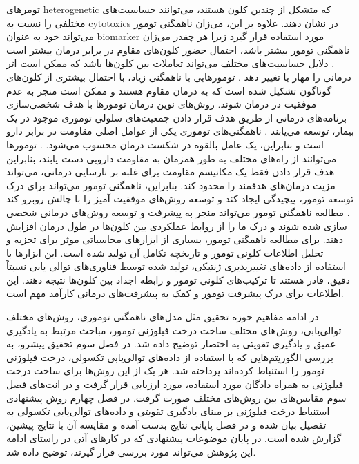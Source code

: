 تومرهای
\gls{heterogenetic}
که متشکل از چندین کلون هستند، می‌توانند حساسیت‌های مختلفی را نسبت به \glspl{cytotoxic} در نشان دهند. علاوه بر این، می‌زان  ناهمگنی تومور می‌تواند خود به عنوان \gls{biomarker} مورد استفاده قرار گیرد زیرا هر چقدر می‌زان ناهمگنی تومور بیشتر باشد، احتمال حضور کلون‌های مقاوم در برابر درمان بیشتر است \cite{truninger2005immunohistochemical}. دلایل حساسیت‌های مختلف می‌تواند تعاملات بین کلون‌ها باشد که ممکن است اثر درمانی را مهار یا تغییر دهد \cite{birbrair2014type}. تومورهایی با ناهمگنی زیاد، با احتمال بیشتری از کلون‌های گوناگون تشکیل شده است که به درمان مقاوم هستند و ممکن است منجر به عدم موفقیت در درمان شوند. روش‌های نوین درمان تومور‌ها با هدف شخصی‌سازی برنامه‌های درمانی از طریق هدف قرار دادن جمعیت‌های سلولی توموری موجود در یک بیمار، توسعه می‌یابند \cite{fedele2014navigating}. ناهمگنی‌های توموری یکی از عوامل اصلی مقاومت در برابر دارو است و بنابراین، یک عامل بالقوه  در شکست درمان محسوب می‌شود. \cite{fedele2014navigating}. تومور‌ها می‌توانند از راه‌های مختلف به طور همزمان به مقاومت دارویی دست یابند، بنابراین هدف قرار دادن فقط یک مکانیسم مقاومت برای غلبه بر نارسایی درمانی، می‌تواند مزیت درمان‌های هدفمند را محدود کند\cite{burrell2014tumour}. بنابراین، ناهمگنی تومور می‌تواند برای درک توسعه تومور، پیچیدگی ایجاد کند و توسعه روش‌های موفقیت آمیز را با چالش روبرو کند \cite{fedele2014navigating}. مطالعه ناهمگنی تومور می‌تواند منجر به پیشرفت و توسعه روش‌های درمانی شخصی سازی شده شوند و درک ما را از روابط عملکردی بین کلون‌ها در طول درمان افزایش دهند\cite{burrell2014tumour}. برای مطالعه ناهمگنی تومور، بسیاری از ابزار‌های محاسباتی موثر برای تجزیه و تحلیل اطلاعات کلونی تومور و تاریخچه تکامل آن تولید شده است. این ابزار‌ها با استفاده از داده‌های تغییرپذیری ژنتیکی، تولید شده توسط فناوری‌های توالی یابی نسبتاً دقیق، قادر هستند تا ترکیب‌های کلونی تومور و رابطه اجداد بین کلون‌ها نتیجه دهند. این اطلاعات برای درک پیشرفت تومور و کمک به پیشرفت‌های درمانی کارآمد مهم است. 


در ادامه مفاهیم حوزه تحقیق مثل مدل‌های ناهمگنی توموری، روش‌های مختلف توالی‌یابی، ‌روش‌های مختلف ساخت درخت فیلوژنی تومور، مباحث مرتبط به یادگیری عمیق و یادگیری تقویتی به اختصار توضیح داده شد. در فصل سوم تحقیق پیشرو، به بررسی الگوریتم‌هایی که با استفاده از داده‌های توالی‌یابی تکسولی، درخت فیلوژنی تومور را استنباط کرده‌اند پرداخته شد. هر یک از این روش‌ها برای ساخت درخت فیلوژنی به همراه دادگان مورد استفاده، مورد ارزیابی قرار گرفت و در انت‌های فصل سوم مقایس‌های بین روش‌های مختلف صورت گرفت. در فصل چهارم روش پیشنهادی استنباط درخت فیلوژنی بر مبنای یادگیری تقویتی و داده‌های توالی‌یابی تکسولی به تفصیل بیان شده و در فصل پایانی نتایج بدست آمده و مقایسه آن با نتایج پیشین، گزارش شده است. در پایان موضوعات پیشنهادی که در کار‌های آتی در راستای ادامه این پژوهش می‌تواند مورد بررسی قرار گیرند، توضیح داده شد. 






